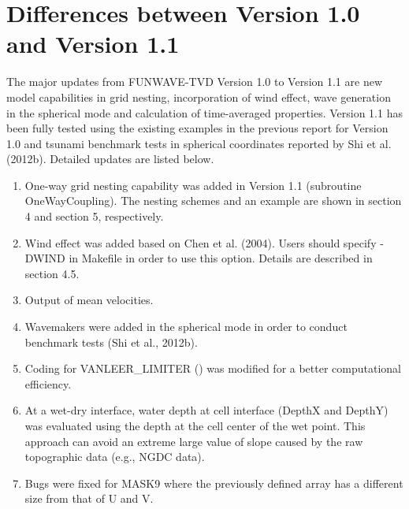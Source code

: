 \documentclass[11pt]{article}
\begin{document}
 \listoftables
 
 \newpage




\newpage

\section*{Differences between Version 1.0 and Version 1.1}

The major updates from FUNWAVE-TVD Version 1.0 to Version 1.1 are new model capabilities in grid nesting, incorporation of wind effect, wave generation in the spherical mode and calculation of time-averaged properties.    Version 1.1 has been fully tested using the existing examples in the previous report for Version 1.0 and  tsunami benchmark tests in spherical coordinates reported by Shi et al. (2012b). Detailed updates are listed below.

\begin{enumerate}

\item One-way grid nesting capability was added in Version 1.1 (subroutine OneWayCoupling). The nesting schemes and an example are shown in section 4 and section 5, respectively. 

\item Wind effect was added based on Chen et al. (2004). Users should specify -DWIND in Makefile in order to use this option.  Details are described in section 4.5.

\item Output of mean velocities.

\item Wavemakers  were added in the spherical mode in order to conduct benchmark tests (Shi et al., 2012b).

\item Coding for VANLEER\_LIMITER () was modified for a better computational efficiency.

\item At a wet-dry interface, water depth at cell interface (DepthX and DepthY) was evaluated using the depth at the cell center of the wet point. This approach can avoid an extreme large value of slope caused by the raw topographic data (e.g., NGDC data). 

\item Bugs were fixed for MASK9 where the previously defined array has a different size from that of U and V.


\end{enumerate}  
\end{document}
